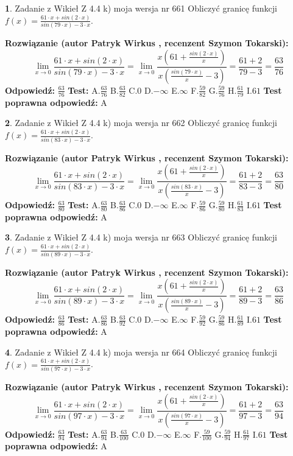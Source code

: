 \documentclass[12pt, a4paper]{article}
\theoremstyle{definition} %
\newtheorem{zad}{}
\newcommand{\zadStart}[1]{\begin{zad}#1\newline}
\newcommand{\zadStop}{\end{zad}}
\newcommand{\rozwStart}[2]{\noindent \textbf{Rozwiązanie (autor #1 , recenzent #2): }\newline}
\newcommand{\rozwStop}{\newline}
\newcommand{\odpStart}{\noindent \textbf{Odpowiedź:}\newline}
\newcommand{\odpStop}{\newline}
\newcommand{\testStart}{\noindent \textbf{Test:}\newline}
\newcommand{\testStop}{\newline}
\newcommand{\kluczStart}{\noindent \textbf{Test poprawna odpowiedź:}\newline}
\newcommand{\kluczStop}{\newline}
\begin{document}
\zadStart{Zadanie z Wikieł Z 4.4 k) moja wersja nr 661}
Obliczyć granicę funkcji $f(x)=\frac{61\cdot x +sin(2\cdot x)}{sin(79\cdot x) -3\cdot x}$.
\zadStop
\rozwStart{Patryk Wirkus}{Szymon Tokarski}
$$\lim\limits_{x\to 0}\frac{61\cdot x +sin(2\cdot x)}{sin(79\cdot x) -3\cdot x}
=\lim\limits_{x\to 0}\frac{x(61+\frac{sin(2\cdot x)}{x})}{x(\frac{sin(79\cdot x)}{x}-3)}
=\frac{61+2}{79-3} = \frac{63}{76}$$
\rozwStop
\odpStart
$\frac{63}{76}$
\odpStop
\testStart
A.$\frac{63}{76}$
B.$\frac{63}{82}$
C.$0$
D.$-\infty$
E.$\infty$
F.$\frac{59}{82}$
G.$\frac{59}{76}$
H.$\frac{61}{79}$
I.$61$
\testStop
\kluczStart
A
\kluczStop



\zadStart{Zadanie z Wikieł Z 4.4 k) moja wersja nr 662}
Obliczyć granicę funkcji $f(x)=\frac{61\cdot x +sin(2\cdot x)}{sin(83\cdot x) -3\cdot x}$.
\zadStop
\rozwStart{Patryk Wirkus}{Szymon Tokarski}
$$\lim\limits_{x\to 0}\frac{61\cdot x +sin(2\cdot x)}{sin(83\cdot x) -3\cdot x}
=\lim\limits_{x\to 0}\frac{x(61+\frac{sin(2\cdot x)}{x})}{x(\frac{sin(83\cdot x)}{x}-3)}
=\frac{61+2}{83-3} = \frac{63}{80}$$
\rozwStop
\odpStart
$\frac{63}{80}$
\odpStop
\testStart
A.$\frac{63}{80}$
B.$\frac{63}{86}$
C.$0$
D.$-\infty$
E.$\infty$
F.$\frac{59}{86}$
G.$\frac{59}{80}$
H.$\frac{61}{83}$
I.$61$
\testStop
\kluczStart
A
\kluczStop



\zadStart{Zadanie z Wikieł Z 4.4 k) moja wersja nr 663}
Obliczyć granicę funkcji $f(x)=\frac{61\cdot x +sin(2\cdot x)}{sin(89\cdot x) -3\cdot x}$.
\zadStop
\rozwStart{Patryk Wirkus}{Szymon Tokarski}
$$\lim\limits_{x\to 0}\frac{61\cdot x +sin(2\cdot x)}{sin(89\cdot x) -3\cdot x}
=\lim\limits_{x\to 0}\frac{x(61+\frac{sin(2\cdot x)}{x})}{x(\frac{sin(89\cdot x)}{x}-3)}
=\frac{61+2}{89-3} = \frac{63}{86}$$
\rozwStop
\odpStart
$\frac{63}{86}$
\odpStop
\testStart
A.$\frac{63}{86}$
B.$\frac{63}{92}$
C.$0$
D.$-\infty$
E.$\infty$
F.$\frac{59}{92}$
G.$\frac{59}{86}$
H.$\frac{61}{89}$
I.$61$
\testStop
\kluczStart
A
\kluczStop



\zadStart{Zadanie z Wikieł Z 4.4 k) moja wersja nr 664}
Obliczyć granicę funkcji $f(x)=\frac{61\cdot x +sin(2\cdot x)}{sin(97\cdot x) -3\cdot x}$.
\zadStop
\rozwStart{Patryk Wirkus}{Szymon Tokarski}
$$\lim\limits_{x\to 0}\frac{61\cdot x +sin(2\cdot x)}{sin(97\cdot x) -3\cdot x}
=\lim\limits_{x\to 0}\frac{x(61+\frac{sin(2\cdot x)}{x})}{x(\frac{sin(97\cdot x)}{x}-3)}
=\frac{61+2}{97-3} = \frac{63}{94}$$
\rozwStop
\odpStart
$\frac{63}{94}$
\odpStop
\testStart
A.$\frac{63}{94}$
B.$\frac{63}{100}$
C.$0$
D.$-\infty$
E.$\infty$
F.$\frac{59}{100}$
G.$\frac{59}{94}$
H.$\frac{61}{97}$
I.$61$
\testStop
\kluczStart
A
\kluczStop
\end{document}
